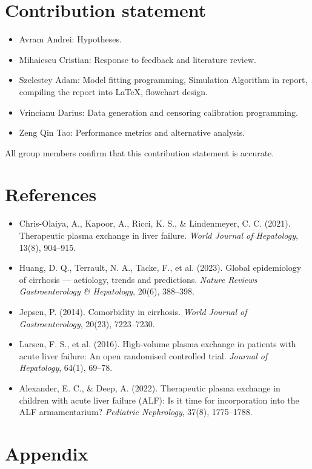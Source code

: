 \documentclass[10pt,a4paper]{article}
\begin{document}
\section*{Contribution statement}
\begin{itemize}[leftmargin=1.2em,itemsep=2pt]
\item Avram Andrei: Hypotheses.
\item Mihaiescu Cristian: Response to feedback and literature review.
\item Szelestey Adam: Model fitting programming, Simulation Algorithm in report, compiling the report into LaTeX, flowchart design.
\item Vrincianu Darius: Data generation and censoring calibration programming.
\item Zeng Qin Tao: Performance metrics and alternative analysis.
\end{itemize}
All group members confirm that this contribution statement is accurate.

\section*{References}
\begin{itemize}[leftmargin=1.2em,itemsep=2pt]\small
\item Chris-Olaiya, A., Kapoor, A., Ricci, K. S., \& Lindenmeyer, C. C. (2021). Therapeutic plasma exchange in liver failure. \emph{World Journal of Hepatology}, 13(8), 904--915.
\item Huang, D. Q., Terrault, N. A., Tacke, F., et al. (2023). Global epidemiology of cirrhosis --- aetiology, trends and predictions. \emph{Nature Reviews Gastroenterology \& Hepatology}, 20(6), 388--398.
\item Jepsen, P. (2014). Comorbidity in cirrhosis. \emph{World Journal of Gastroenterology}, 20(23), 7223--7230.
\item Larsen, F. S., et al. (2016). High-volume plasma exchange in patients with acute liver failure: An open randomised controlled trial. \emph{Journal of Hepatology}, 64(1), 69--78.
\item Alexander, E. C., \& Deep, A. (2022). Therapeutic plasma exchange in children with acute liver failure (ALF): Is it time for incorporation into the ALF armamentarium? \emph{Pediatric Nephrology}, 37(8), 1775--1788.
\end{itemize}

\newpage
\section{Appendix}
\end{document}
